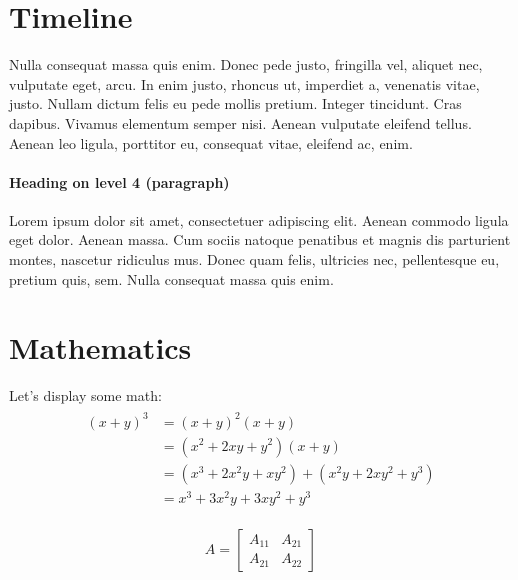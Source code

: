 \documentclass[paper=a4, fontsize=11pt]{scrartcl}	%
\numberwithin{equation}{section}															%
\numberwithin{figure}{section}																%
\numberwithin{table}{section}																%
\begin{document}
\section{Timeline}
Nulla consequat massa quis enim. Donec pede justo, fringilla vel, aliquet nec, vulputate eget, arcu. In enim justo, rhoncus ut, imperdiet a, venenatis vitae, justo. Nullam dictum felis eu pede mollis pretium. Integer tincidunt. Cras dapibus. Vivamus elementum semper nisi. Aenean vulputate eleifend tellus. Aenean leo ligula, porttitor eu, consequat vitae, eleifend ac, enim.

\paragraph{Heading on level 4 (paragraph)}
Lorem ipsum dolor sit amet, consectetuer adipiscing elit. Aenean commodo ligula eget dolor. Aenean massa. Cum sociis natoque penatibus et magnis dis parturient montes, nascetur ridiculus mus. Donec quam felis, ultricies nec, pellentesque eu, pretium quis, sem. Nulla consequat massa quis enim. 


\section{Mathematics}
Let's display some math:
\begin{align} 
	\begin{split}
	(x+y)^3 	&= (x+y)^2(x+y)\\
					&=(x^2+2xy+y^2)(x+y)\\
					&=(x^3+2x^2y+xy^2) + (x^2y+2xy^2+y^3)\\
					&=x^3+3x^2y+3xy^2+y^3
	\end{split}					
\end{align}

\begin{align}
	A = 
	\begin{bmatrix}
	A_{11} & A_{21} \\
  	A_{21} & A_{22}
	\end{bmatrix}
\end{align}
\end{document}
